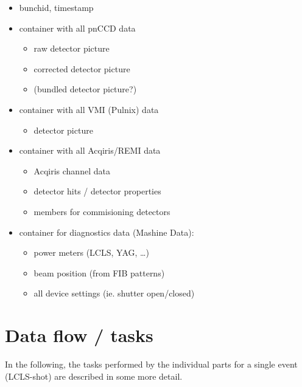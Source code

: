 \documentclass[11pt,a4paper,oneside]{article}
\begin{document}
\begin{itemize}
\item bunchid, timestamp
\item container with all pnCCD data
	\begin{itemize}
	\item raw detector picture
	\item corrected detector picture
	\item (bundled detector picture?)
	\end{itemize}
\item container with all VMI (Pulnix) data
	\begin{itemize}
	\item detector picture
	\end{itemize}
\item container with all Acqiris/REMI data
	\begin{itemize}
	\item Acqiris channel data
	\item detector hits / detector properties
	\item members for commisioning detectors
	\end{itemize}
\item container for diagnostics data (Mashine Data):
   \begin{itemize}
   \item power meters (LCLS, YAG, \dots )
   \item beam position (from FIB patterns)
   \item all device settings (ie. shutter open/closed)
   \end{itemize}
\end{itemize}



\section{Data flow / tasks}
\label{sec:tasks}

In the following, the tasks performed by the individual parts for a single event (LCLS-shot) are described in some more detail.
\end{document}
